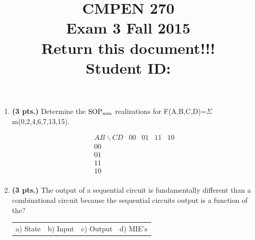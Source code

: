 \documentclass{article}
\begin{document}
\newcommand{\SOPmin}{${\rm SOP}_{\rm min} \ $}
\newcommand{\POSmin}{${\rm POS}_{\rm min} \ $}
\newcommand{\bs}{\backslash}
\newcommand{\x}{\addtocounter{enumi}{1} \theenumi}


\title{
\Huge{CMPEN 270}\\
\normalsize{Exam 3		Fall 2015}\\
\normalsize{Return this document!!!}\\
Student ID:}
\date{}

\maketitle{}

\begin{enumerate}
\item {\bf (3 pts.)} Determine the \SOPmin realizations for
F(A,B,C,D)=$\Sigma$m(0,2,4,6,7,13,15).

$$ \begin{array} {c||c|c|c|c}
        AB \bs CD & 00 & 01 & 11 & 10 \\ \hline \hline
        00        &    &    &    &    \\ \hline
        01        &    &    &    &    \\ \hline
        11        &    &    &    &    \\ \hline
        10        &    &    &    &    \\
\end{array} $$ 


\item {\bf (3 pts.)} The output of a sequential circuit is fundamentally
different than a combinational circuit because the sequential circuits 
output is a function of the?

\begin{tabular}{p{0.75in}p{0.75in}p{0.75in}p{0.75in}}
a) State & b) Input & c) Output & d) MIE's \\
\end{tabular}


\end{enumerate}
\end{document}
